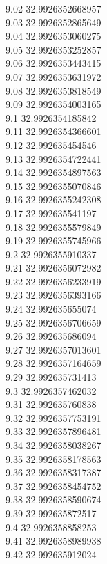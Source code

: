 {9.02	32.9926352668957\\
9.03	32.9926352865649\\
9.04	32.9926353060275\\
9.05	32.9926353252857\\
9.06	32.9926353443415\\
9.07	32.9926353631972\\
9.08	32.9926353818549\\
9.09	32.9926354003165\\
9.1	32.9926354185842\\
9.11	32.9926354366601\\
9.12	32.992635454546\\
9.13	32.9926354722441\\
9.14	32.9926354897563\\
9.15	32.9926355070846\\
9.16	32.9926355242308\\
9.17	32.992635541197\\
9.18	32.9926355579849\\
9.19	32.9926355745966\\
9.2	32.9926355910337\\
9.21	32.9926356072982\\
9.22	32.9926356233919\\
9.23	32.9926356393166\\
9.24	32.992635655074\\
9.25	32.9926356706659\\
9.26	32.992635686094\\
9.27	32.9926357013601\\
9.28	32.9926357164659\\
9.29	32.992635731413\\
9.3	32.9926357462032\\
9.31	32.992635760838\\
9.32	32.9926357753191\\
9.33	32.9926357896481\\
9.34	32.9926358038267\\
9.35	32.9926358178563\\
9.36	32.9926358317387\\
9.37	32.9926358454752\\
9.38	32.9926358590674\\
9.39	32.992635872517\\
9.4	32.9926358858253\\
9.41	32.9926358989938\\
9.42	32.992635912024\\
}
